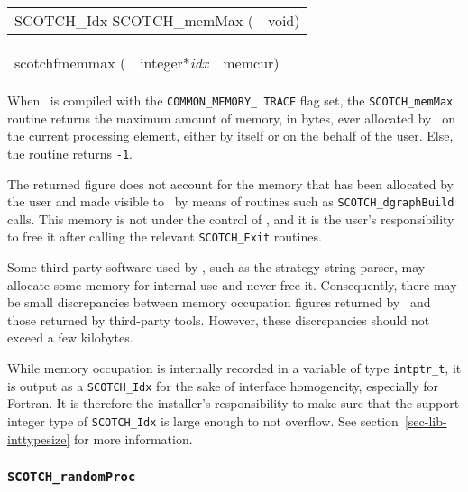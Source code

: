 \begin{itemize}
\progsyn

{\tt\begin{tabular}{l@{}l}
SCOTCH\_Idx SCOTCH\_memMax ( & void)
\end{tabular}}

{\tt\begin{tabular}{l@{}ll}
scotchfmemmax ( & integer*{\it idx} & memcur) \\

\end{tabular}}

\progdes

When \scotch\ is compiled with the {\tt COMMON\_\lbt MEMORY\_\lbt
TRACE} flag set, the {\tt SCOTCH\_memMax} routine returns the maximum
amount of memory, in bytes, ever allocated by \scotch\ on the current
processing element, either by itself or on the behalf of the
user. Else, the routine returns {\tt -1}.

The returned figure does not account for the memory that has been
allocated by the user and made visible to \scotch\ by means of
routines such as {\tt SCOTCH\_\lbt dgraph\lbt Build} calls. This
memory is not under the control of \scotch, and it is the user's
responsibility to free it after calling the relevant
{\tt SCOTCH\_\lbt *\lbt Exit} routines.

Some third-party software used by \scotch, such as the strategy string
parser, may allocate some memory for internal use and never free it.
Consequently, there may be small discrepancies between memory
occupation figures returned by \scotch\ and those returned by
third-party tools. However, these discrepancies should not exceed a
few kilobytes.

While memory occupation is internally recorded in a variable of type
{\tt intptr\_\lbt t}, it is output as a {\tt SCOTCH\_\lbt Idx} for the
sake of interface homogeneity, especially for Fortran. It is therefore
the installer's responsibility to make sure that the support integer
type of {\tt SCOTCH\_\lbt Idx} is large enough to not overflow. See
section~\ref{sec-lib-inttypesize} for more information.
\end{itemize}

\subsubsection{{\tt SCOTCH\_randomProc}}

